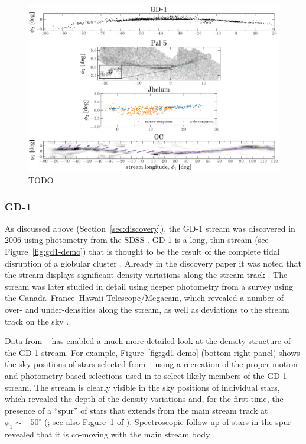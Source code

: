 \documentclass[final,5p,times,twocolumn,authoryear]{elsarticle}
\begin{document}
\begin{figure}[t!]
    \centering
    \includegraphics[width=\textwidth]{figures/stream-density-structure.pdf}
    \caption{
        TODO
        \label{fig:four-obs-streams}
    }
\end{figure}

\subsubsection{GD-1}
\label{sec:gd1}

As discussed above (Section~\ref{sec:discovery}), the GD-1 stream was discovered in 2006
using photometry from the SDSS \citep{grillmair:2006-gd1}.
GD-1 is a long, thin stream (see Figure~\ref{fig:gd1-demo}) that is thought to be the
result of the complete tidal disruption of a globular cluster \citep{koposov:2010}.
Already in the discovery paper it was noted that the stream displays significant density
variations along the stream track \citep{grillmair:2006-gd1}.
The stream was later studied in detail using deeper photometry from a survey using the
Canada--France--Hawaii Telescope/Megacam, which revealed a number of over- and
under-densities along the stream, as well as deviations to the stream track
on the sky \citep{deboer:2018}.

Data from \gaia\  has enabled a much more detailed look at the density structure
of the GD-1 stream.
For example, Figure~\ref{fig:gd1-demo} (bottom right panel) shows the sky positions of
stars selected from \gaia\  using a recreation of the proper motion and
photometry-based selections used in \citep{price-whelan:2018} to select likely members
of the GD-1 stream.
The stream is clearly visible in the sky positions of individual stars, which revealed
the depth of the density variations and, for the first time, the presence of a ``spur''
of stars that extends from the main stream track at $\phi_1 \sim -50^\circ$
(\citealt{price-whelan:2018}; see also Figure~1 of \citealt{bonaca:2019b}).
Spectroscopic follow-up of stars in the spur revealed that it is co-moving with the main
stream body \citep{bonaca:2020b}.
\end{document}
